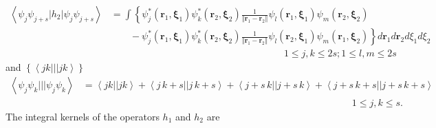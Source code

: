 \documentclass[aps,preprint]{revtex4}%
\begin{document}
\begin{align}
\left\langle \psi_{j}\psi_{j+s}|h_{2}|\psi_{j}\psi_{j+s}\right\rangle  &
=\int\left\{  \psi_{j}^{\ast}\left(  \mathbf{r}_{1}\mathbf{,\xi}_{1}\right)
\psi_{k}^{\ast}\left(  \mathbf{r}_{2}\mathbf{,\xi}_{2}\right)  \frac
{1}{\left\Vert \mathbf{r}_{1}-\mathbf{r}_{2}\right\Vert }\psi_{l}\left(
\mathbf{r}_{1}\mathbf{,\xi}_{1}\right)  \psi_{m}\left(  \mathbf{r}%
_{2}\mathbf{,\xi}_{2}\right)  \right. \nonumber\\
&  \qquad-\left.  \psi_{j}^{\ast}\left(  \mathbf{r}_{1}\mathbf{,\xi}%
_{1}\right)  \psi_{k}^{\ast}\left(  \mathbf{r}_{2}\mathbf{,\xi}_{2}\right)
\frac{1}{\left\Vert \mathbf{r}_{1}-\mathbf{r}_{2}\right\Vert }\psi_{l}\left(
\mathbf{r}_{2}\mathbf{,\xi}_{1}\right)  \psi_{m}\left(  \mathbf{r}%
_{1}\mathbf{,\xi}_{2}\right)  \right\}  d\mathbf{r}_{1}d\mathbf{r}_{2}d\xi
_{1}d\xi_{2}\nonumber\\
&  \left.  {}\right.  \qquad\qquad\qquad\qquad\qquad\qquad\qquad\qquad
\qquad1\leq j,k\leq2s;1\leq l,m\leq2s \label{h2}%
\end{align}
and $\left\{  \left\langle jk|||jk\right\rangle \right\}  $
\begin{align}
\left\langle \psi_{j}\psi_{k}|||\psi_{j}\psi_{k}\right\rangle  &
=\left\langle jk||jk\right\rangle +\left\langle j\,k+s||j\,k+s\right\rangle
+\left\langle j+s\,k||j+s\,k\right\rangle +\left\langle
j+s\,k+s||j+s\,k+s\right\rangle \nonumber\\
&  \left.  {}\right.  \qquad\qquad\qquad\qquad\qquad\qquad\qquad\qquad
\qquad\qquad\qquad\qquad\qquad\qquad1\leq j,k\leq s.
\end{align}
The integral kernels of the operators $h_{1}$ and $h_{2}$ are
\end{document}
